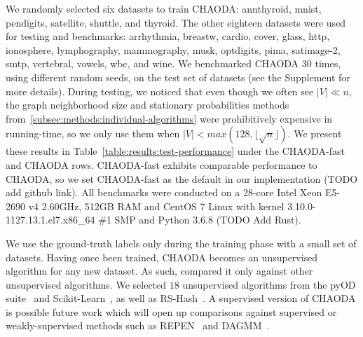 We randomly selected six datasets to train CHAODA: annthyroid, mnist, pendigits, satellite, shuttle, and thyroid.
The other eighteen datasets were used for testing and benchmarks: arrhythmia, breastw, cardio, cover, glass, http, ionosphere, lymphography, mammography, musk, optdigits, pima, satimage-2, smtp, vertebral, vowels, wbc, and wine.
We benchmarked CHAODA 30 times, using different random seeds, on the test set of datasets (see the Supplement for more details).
During testing, we noticed that even though we often see $|V| \ll n $, the graph neighborhood size and stationary probabilities methods from~\ref{subsec:methods:individual-algorithms} were prohibitively expensive in running-time, so we only use them when $|V| < max(128, \lfloor \sqrt n \rfloor)$.
We present these results in Table~\ref{table:results:test-performance} under the CHAODA-fast and CHAODA rows.
CHAODA-fast exhibits comparable performance to CHAODA, so we set CHAODA-fast as the default in our implementation (TODO add github link).
All benchmarks were conducted on a 28-core Intel Xeon E5-2690 v4 2.60GHz, 512GB RAM and CentOS 7 Linux with kernel 3.10.0-1127.13.1.el7.x86\_64 \#1 SMP and Python 3.6.8 (TODO Add Rust).

We use the ground-truth labels only during the training phase with a small set of datasets.
Having once been trained, CHAODA becomes an unsupervised algorithm for any new dataset.
As such, compared it only against other unsupervised algorithms.
We selected $18$ unsupervised algorithms from the pyOD suite~\cite{zhao2019pyod} and Scikit-Learn~\cite{pedregosa2011scikit}, as well as RS-Hash~\cite{sathe2016subspace}.
A supervised version of CHAODA is possible future work which will open up comparisons against supervised or weakly-supervised methods such as REPEN~\cite{pang2018learning} and DAGMM~\cite{zong2018deep}.
